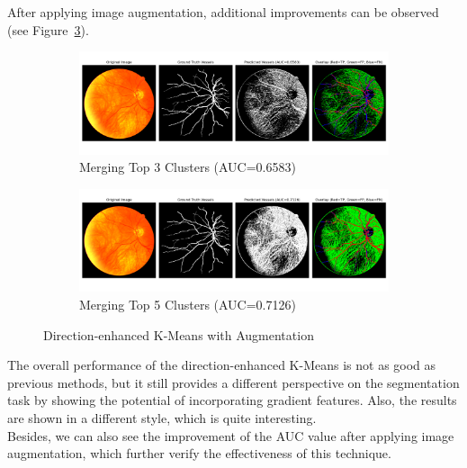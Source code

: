 \documentclass[12pt,letterpaper]{article}
\begin{document}
\noindent
After applying image augmentation, additional improvements can be observed (see Figure~\ref{fig:de_aug}).
\begin{figure}[H]
    \centering
    \begin{subfigure}[H]{\textwidth}
        \centering
        \includegraphics[scale=0.35]{Figures/6 Directed (Merge 3 Clusters).png}
        \vspace{-0.5cm}
        \caption{Merging Top 3 Clusters (AUC=0.6583)}
        \label{fig:de_aug3}
    \end{subfigure}
    \begin{subfigure}[H]{\textwidth}
        \centering
        \includegraphics[scale=0.35]{Figures/6 Directed (Merge 5 Clusters).png}
        \vspace{-0.5cm}
        \caption{Merging Top 5 Clusters (AUC=0.7126)}
        \label{fig:de_aug5}
    \end{subfigure}
    \caption{Direction-enhanced K-Means with Augmentation}
    \label{fig:de_aug}
\end{figure}
\noindent
The overall performance of the direction-enhanced K-Means is not as good as previous methods, but it still provides a different perspective on the segmentation task by showing the potential of incorporating gradient features. Also, the results are shown in a different style, which is quite interesting. \\
Besides, we can also see the improvement of the AUC value after applying image augmentation, which further verify the effectiveness of this technique. 
\end{document}
